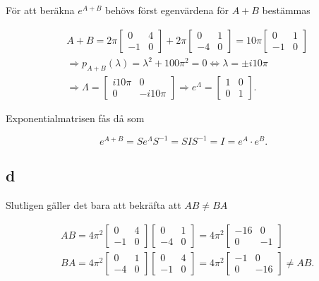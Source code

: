 \documentclass[a4paper]{article}
\newcommand{\mat}[1]{\bm{\mathit{#1}}}
\begin{document}
\noindent För att beräkna $e^{\mat{A} + \mat{B}}$ behövs först egenvärdena för
$\mat{A} + \mat{B}$ bestämmas

\begin{align*}
  &\mat{A} + \mat{B} = 2\pi\begin{bmatrix}0 & 4\\-1 & 0\end{bmatrix} + 2\pi\begin{bmatrix}0 & 1\\-4 & 0\end{bmatrix} = 10\pi\begin{bmatrix}0 & 1\\-1 & 0\end{bmatrix}\\[2ex]
  &\Rightarrow p_{A+B}(\lambda) = \lambda^2 + 100\pi^2 = 0 \iff \lambda = \pm i10\pi\\[2ex]
  &\Rightarrow \mat{\Lambda} = \begin{bmatrix}i10\pi & 0\\0 & -i10\pi\end{bmatrix} \Rightarrow e^{\mat{\Lambda}} = \begin{bmatrix}1 & 0\\0 & 1\end{bmatrix}.
\end{align*}

\noindent Exponentialmatrisen fås då som

\begin{equation*}
  e^{\mat{A}+\mat{B}} = \mat{S}e^{\mat{\Lambda}}\mat{S}^{-1} = \mat{SIS}^{-1} = \mat{I} = e^{\mat{A}}\cdot e^{\mat{B}}.
\end{equation*}

\subsection*{d}

Slutligen gäller det bara att bekräfta att $\mat{AB} \neq \mat{BA}$

\begin{align*}
  &\mat{AB} = 4\pi^2\begin{bmatrix}0 & 4\\-1 & 0\end{bmatrix}\begin{bmatrix}0 & 1\\-4 & 0\end{bmatrix} = 4\pi^2\begin{bmatrix}-16 & 0\\0 & -1\end{bmatrix}\\[2ex]
  &\mat{BA} = 4\pi^2\begin{bmatrix}0 & 1\\-4 & 0\end{bmatrix}\begin{bmatrix}0 & 4\\-1 & 0\end{bmatrix} = 4\pi^2\begin{bmatrix}-1 & 0\\0 & -16\end{bmatrix} \neq \mat{AB}.
\end{align*}
\end{document}
